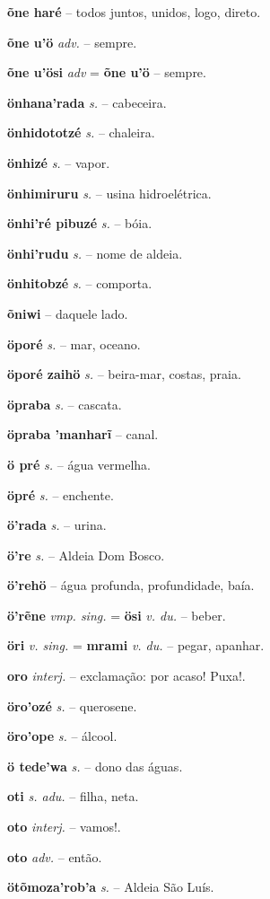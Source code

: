 \textbf{õne haré} -- todos juntos, unidos, logo, direto.

\textbf{õne u'ö} \textit{adv.} -- sempre.

\textbf{õne u'ösi} \textit{adv} = \textbf{õne u'ö} -- sempre.

\textbf{önhana'rada} \textit{s.} -- cabeceira.

\textbf{önhidototzé} \textit{s.} -- chaleira.

\textbf{önhizé} \textit{s.} -- vapor.

\textbf{önhimiruru} \textit{s.} -- usina hidroelétrica.

\textbf{önhi'ré pibuzé} \textit{s.} -- bóia.

\textbf{önhi'rudu} \textit{s.} -- nome de aldeia.

\textbf{önhitobzé} \textit{s.} -- comporta.

\textbf{õniwi} -- daquele lado.

\textbf{öporé} \textit{s.} -- mar, oceano.

\textbf{öporé zaihö} \textit{s.} -- beira-mar, costas, praia.

\textbf{öpraba} \textit{s.} -- cascata.

\textbf{öpraba 'manharĩ} -- canal.

\textbf{ö pré} \textit{s.} -- água vermelha.

\textbf{öpré} \textit{s.} -- enchente.

\textbf{ö'rada} \textit{s.} -- urina.

\textbf{ö're} \textit{s.} -- Aldeia Dom Bosco.

\textbf{ö'rehö} -- água profunda, profundidade, baía.

\textbf{ö'rẽne} \textit{vmp. sing.} = \textbf{ösi} \textit{v. du.} -- beber.

\textbf{öri} \textit{v. sing.} = \textbf{mrami} \textit{v. du.} -- pegar, apanhar.

\textbf{oro} \textit{interj.} -- exclamação: por acaso! Puxa!.

\textbf{öro'ozé} \textit{s.} -- querosene.

\textbf{öro'ope} \textit{s.} -- álcool.

\textbf{ö tede'wa} \textit{s.} -- dono das águas.

\textbf{oti} \textit{s. adu.} -- filha, neta.

\textbf{oto} \textit{interj.} -- vamos!.

\textbf{oto} \textit{adv.} -- então.

\textbf{ötõmoza'rob'a} \textit{s.} -- Aldeia São Luís.

